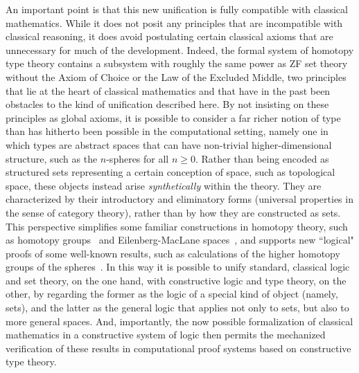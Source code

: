 \documentclass[11pt]{article}
\theoremstyle{remark}
\theoremstyle{definition}
\begin{document}
An important point is that this new unification is fully compatible with classical mathematics.  While it does not posit any principles that are incompatible with classical reasoning, it does avoid postulating certain classical axioms that are unnecessary for much of the development. 
Indeed, the formal system of homotopy type theory contains a subsystem with roughly the same power as ZF set theory without the
Axiom of Choice or the Law of the Excluded Middle, two principles that lie at the heart of classical mathematics and that have in the past been obstacles to the kind of unification described here.  By not insisting on these principles as global axioms, it is possible to consider a far richer notion of type than has hitherto been possible in the computational setting, namely one in which types are abstract spaces that can have non-trivial higher-dimensional structure, such as the $n$-spheres for all $n\geq 0$.  Rather than being encoded as structured sets representing a certain conception of space, such as topological space, these objects instead arise \emph{synthetically} within the theory.  They are characterized by their introductory and eliminatory forms (universal properties in the sense of category theory), rather than by how they are constructed as sets. This perspective simplifies some familiar constructions in homotopy theory, such as homotopy groups~\cite{HoTTbook,LS-Circ} 
and Eilenberg-MacLane spaces~\cite{LF-EM}, and supports new ``logical" proofs 
of some well-known results, such as calculations of the higher homotopy groups of the spheres~\cite{LB-PinSn}.  
In this way it is possible to unify standard, classical logic and set theory, on the one hand, with constructive logic and type theory, on the other, by regarding the former as the logic of a special kind of object (namely, sets), and the latter as the general logic that applies not only to sets, but also to more general spaces.  And, importantly, the now possible formalization of classical mathematics in a constructive system of logic then permits the mechanized verification of these results in computational proof systems based on constructive type theory.
\end{document}
